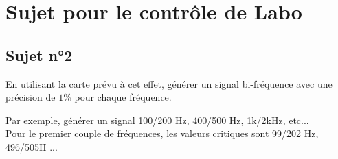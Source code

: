 \section{Sujet pour le contrôle de Labo}     

\subsection{Sujet n°2}



En utilisant la carte prévu à cet effet, générer un signal bi-fréquence avec une précision de $1\%$ pour chaque fréquence.

Par exemple, générer un signal 100/200 Hz, 400/500 Hz, 1k/2kHz, etc... \\

Pour le premier couple de fréquences, les valeurs critiques sont 99/202 Hz, 496/505H ...

